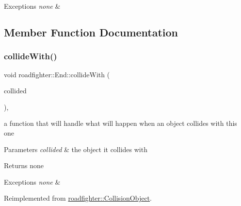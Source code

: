 \begin{DoxyExceptions}{Exceptions}
{\em none} & \\
\hline
\end{DoxyExceptions}


\subsection{Member Function Documentation}
\mbox{\label{classroadfighter_1_1End_a56dfbe6f0c760a5728b58fc9d9f40486}} 
\subsubsection{\texorpdfstring{collide\+With()}{collideWith()}}
{\footnotesize\ttfamily void roadfighter\+::\+End\+::collide\+With (\begin{DoxyParamCaption}\item[{std\+::shared\+\_\+ptr$<$ \hyperlink{classroadfighter_1_1CollisionObject}{Collision\+Object} $>$ \&}]{collided }\end{DoxyParamCaption})\hspace{0.3cm}{\ttfamily [override]}, {\ttfamily [virtual]}}

a function that will handle what will happen when an object collides with this one 
\begin{DoxyParams}{Parameters}
{\em collided} & the object it collides with \\
\hline
\end{DoxyParams}
\begin{DoxyReturn}{Returns}
none 
\end{DoxyReturn}

\begin{DoxyExceptions}{Exceptions}
{\em none} & \\
\hline
\end{DoxyExceptions}


Reimplemented from \hyperlink{classroadfighter_1_1CollisionObject_a9eba85551432f548f2a0c20217a60f42}{roadfighter\+::\+Collision\+Object}.

\mbox{\label{classroadfighter_1_1End_aee4a4fed3e7bd5f85f183351280e54f9}} 
